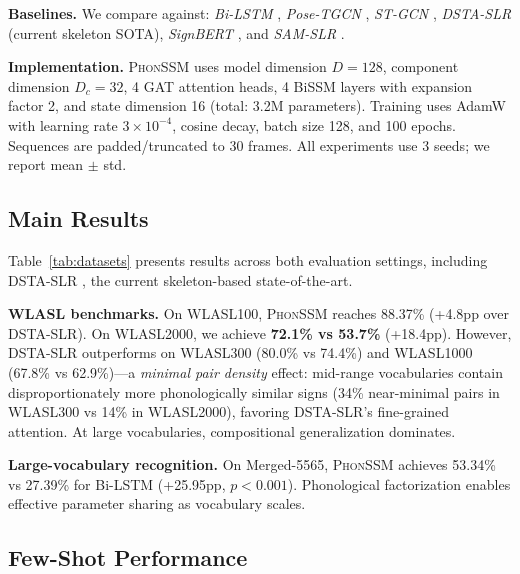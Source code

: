 \documentclass[runningheads]{llncs}
\newcommand{\phonssm}{\textsc{PhonSSM}}
\begin{document}
\textbf{Baselines.} We compare against: \textit{Bi-LSTM} \cite{hochreiter1997lstm}, \textit{Pose-TGCN} \cite{li2020word}, \textit{ST-GCN} \cite{yan2018spatial}, \textit{DSTA-SLR} \cite{hu2024dsta} (current skeleton SOTA), \textit{SignBERT} \cite{hu2021signbert}, and \textit{SAM-SLR} \cite{jiang2021skeleton}.

\textbf{Implementation.} \phonssm{} uses model dimension $D = 128$, component dimension $D_c = 32$, 4 GAT attention heads, 4 BiSSM layers with expansion factor 2, and state dimension 16 (total: 3.2M parameters). Training uses AdamW \cite{loshchilov2019adamw} with learning rate $3 \times 10^{-4}$, cosine decay, batch size 128, and 100 epochs. Sequences are padded/truncated to 30 frames. All experiments use 3 seeds; we report mean $\pm$ std.

\subsection{Main Results}

Table~\ref{tab:datasets} presents results across both evaluation settings, including DSTA-SLR \cite{hu2024dsta}, the current skeleton-based state-of-the-art.

\textbf{WLASL benchmarks.} On WLASL100, \phonssm{} reaches 88.37\% (+4.8pp over DSTA-SLR). On WLASL2000, we achieve \textbf{72.1\% vs 53.7\%} (+18.4pp). However, DSTA-SLR outperforms on WLASL300 (80.0\% vs 74.4\%) and WLASL1000 (67.8\% vs 62.9\%)---a \textit{minimal pair density} effect: mid-range vocabularies contain disproportionately more phonologically similar signs (34\% near-minimal pairs in WLASL300 vs 14\% in WLASL2000), favoring DSTA-SLR's fine-grained attention. At large vocabularies, compositional generalization dominates.

\textbf{Large-vocabulary recognition.} On Merged-5565, \phonssm{} achieves 53.34\% vs 27.39\% for Bi-LSTM (+25.95pp, $p < 0.001$). Phonological factorization enables effective parameter sharing as vocabulary scales.

\subsection{Few-Shot Performance}
\end{document}
